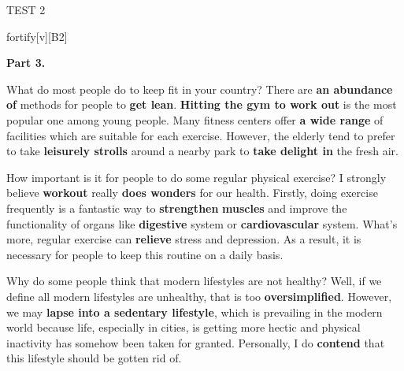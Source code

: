 \begin{glossarymc}[Cambridge 6]
\begin{test}{TEST 2}
\begin{VocabExplain}[Part 2]
        \begin{ExplainCard}{fortify}[v][B2]
        \end{ExplainCard}
        \end{VocabExplain}

    \noindent
    \textbf{Part 3.}
    \begin{qa}{What do most people do to keep fit in your country?}
    There are \textbf{an abundance of} methods for people to \textbf{get lean}. \textbf{Hitting the gym to work out} is the most popular one among young people. Many fitness centers offer \textbf{a wide range} of facilities which are suitable for each exercise. However, the elderly tend to prefer to take \textbf{leisurely strolls} around a nearby park to \textbf{take delight in} the fresh air.
    \end{qa}

    \begin{qa}{How important is it for people to do some regular physical exercise?}
    I strongly believe \textbf{workout} really \textbf{does wonders} for our health. Firstly, doing exercise frequently is a fantastic way to \textbf{strengthen} \textbf{muscles} and improve the functionality of organs like \textbf{digestive} system or \textbf{cardiovascular} system. What’s more, regular exercise can \textbf{relieve} stress and depression. As a result, it is necessary for people to keep this routine on a daily basis.
    \end{qa}

    \begin{qa}{Why do some people think that modern lifestyles are not healthy?}
    Well, if we define all modern lifestyles are unhealthy, that is too \textbf{oversimplified}. However, we may \textbf{lapse into a sedentary lifestyle}, which is prevailing in the modern world because life, especially in cities, is getting more hectic and physical inactivity has somehow been taken for granted. Personally, I do \textbf{contend} that this lifestyle should be gotten rid of.
    \end{qa}


\end{test}
\end{glossarymc}
